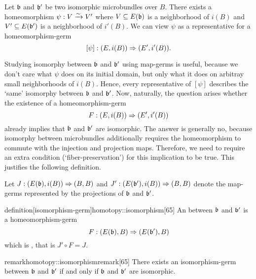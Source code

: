 \begin{myparagraph}
    Let $\bb$ and $\bb'$ be two isomorphic microbundles over $B$.
    There exists a homeomorphism $\psi: V \xrightarrow{\sim} V'$ where
    $V \sub E(\bb)$ is a neighborhood of $i(B)$
    and $V' \sub E(\bb')$ is a neighborhood of $i'(B)$.
    We can view $\psi$ as a representative for a homeomorphism-germ
    \[ [\psi]: (E, i(B)) \Rightarrow{} (E', i'(B)). \]
    
    Studying isomorphy between $\bb$ and $\bb'$
    using map-germs is useful,
    because we don't care what $\psi$ does on its initial domain,
    but only what it does on arbitray small neighborhoods of $i(B)$.
    Hence, every representative of $[\psi]$
    describes the `same' isomorphy between $\bb$ and $\bb'$.
    Now, naturally, the question arises whether
    the existence of a homeomorphism-germ
    \[ F: (E, i(B)) \Rightarrow{} (E', i'(B)) \]
    already implies that $\bb$ and $\bb'$ are isomorphic.
    The answer is generally no, because isomorphy between microbundles
    additionally requires 
    the homeomorphism to commute with the injection and projection maps.
    Therefore, we need to require an extra condition (`fiber-preservation')
    for this implication to be true.
    This justifies the following definition.
    
    Let $\germdef{J}{(E(\bb), i(B))}{(B, B)}$ and $\germdef{J'}{(E(\bb'), i(B))}{(B, B)}$
    denote the map-germs represented by the projections of $\bb$ and $\bb'$.
\end{myparagraph}

\begin{mystatement}{definition}[isomorphism-germ]{homotopy::isomorphism}[65]
    An  between $\bb$ and $\bb'$ is a homeomorphism-germ 
    \[ \germdef{F}{(E(\bb), B)}{(E(\bb'), B)} \]
    which is , that is $J' \circ F = J$.
\end{mystatement}

\begin{mystatement}{remark}{homotopy::isomorphismremark}[65]
    There exists an isomorphism-germ between $\bb$ and $\bb'$
    if and only if $\bb$ and $\bb'$ are isomorphic.
\end{mystatement}
